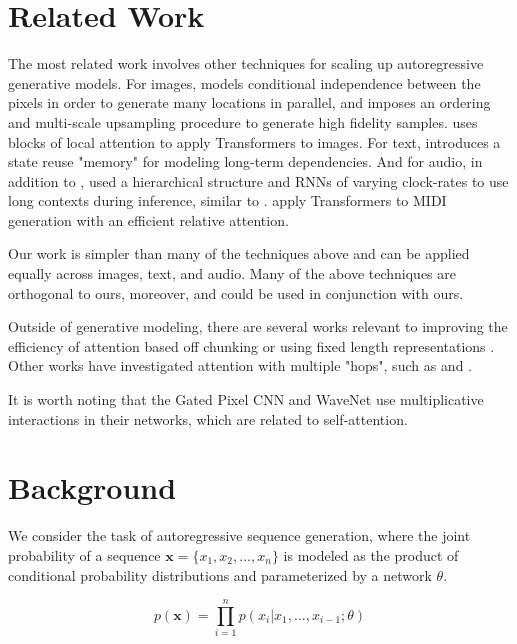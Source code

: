 \documentclass{article}
\begin{document}
\section{Related Work}

The most related work involves other techniques for scaling up autoregressive generative models. For images, \cite{reed2017parallel} models conditional independence between the pixels in order to generate many locations in parallel, and \cite{menick2018generating} imposes an ordering and multi-scale upsampling procedure to generate high fidelity samples. \cite{parmar2018image} uses blocks of local attention to apply Transformers to images.  For text, \cite{dai2018transformer} introduces a state reuse "memory" for modeling long-term dependencies. And for audio, in addition to \cite{van2016wavenet}, \cite{mehri2016samplernn} used a hierarchical structure and RNNs of varying clock-rates to use long contexts during inference, similar to \cite{koutnik2014clockwork}. \cite{huang2018improved} apply Transformers to MIDI generation with an efficient relative attention.

Our work is simpler than many of the techniques above and can be applied equally across images, text, and audio. Many of the above techniques are orthogonal to ours, moreover, and could be used in conjunction with ours.

Outside of generative modeling, there are several works relevant to improving the efficiency of attention based off chunking \cite{chiu2017monotonic} or using fixed length representations \cite{britz2017efficient}. Other works have investigated attention with multiple "hops", such as \cite{sukhbaatar2015end} and  \cite{gehring2017convolutional}.

It is worth noting that the Gated Pixel CNN \cite{oord2016pixel} and WaveNet \cite{van2016wavenet} use multiplicative interactions in their networks, which are related to self-attention.

\section{Background}
We consider the task of autoregressive sequence generation, where the joint probability of a sequence $\mathbf{x} = \{x_1, x_2, ..., x_n\}$ is modeled as the product of conditional probability distributions and parameterized by a network $\theta$.

\begin{equation}\label{autoregressive}
p(\mathbf{x}) = \prod_{i=1}^{n} p(x_i \vert x_1, ..., x_{i-1}; \theta) \end{equation}
\end{document}
